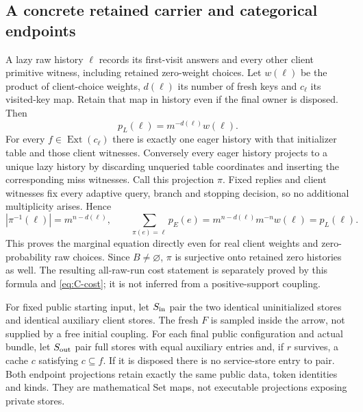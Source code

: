 \documentclass[11pt,a4paper]{article}
\theoremstyle{definition}
\begin{document}
\subsection{A concrete retained carrier and categorical endpoints}\label{sec:C-span}
A lazy raw history $\ell$ records its first-visit answers and every other
client primitive witness, including retained zero-weight choices. Let
$w(\ell)$ be the product of client-choice weights, $d(\ell)$ its number
of fresh keys and $c_\ell$ its visited-key map. Retain that map in history
even if the final owner is disposed. Then
\[
p_L(\ell)=m^{-d(\ell)}w(\ell).
\]
For every $f\in\operatorname{Ext}(c_\ell)$ there is exactly one eager
history with that initializer table and those client witnesses. Conversely
every eager history projects to a unique lazy history by discarding
unqueried table coordinates and inserting the corresponding miss witnesses.
Call this projection $\pi$. Fixed replies and client witnesses fix every
adaptive query, branch and stopping decision, so no additional multiplicity
arises. Hence
\begin{equation}\label{eq:C-fibre}
|\pi^{-1}(\ell)|=m^{n-d(\ell)},\qquad
\sum_{\pi(e)=\ell}p_E(e)
=m^{n-d(\ell)}m^{-n}w(\ell)=p_L(\ell).
\end{equation}
This proves the marginal equation directly even for real client weights
and zero-probability raw choices. Since $B\ne\varnothing$, $\pi$ is
surjective onto retained zero histories as well. The resulting all-raw-run
cost statement is separately proved by this formula and
\eqref{eq:C-cost}; it is not inferred from a positive-support coupling.

For fixed public starting input, let $S_{\rm in}$ pair the two identical
uninitialized stores and identical auxiliary client stores. The fresh
$F$ is sampled inside the arrow, not supplied by a free initial coupling.
For each final public configuration and actual bundle, let $S_{\rm out}$
pair full stores with equal auxiliary entries and, if $r$ survives, a
cache $c$ satisfying $c\subseteq f$. If it is disposed there is no
service-store entry to pair. Both endpoint projections retain exactly
the same public data, token identities and kinds. They are mathematical
Set maps, not executable projections exposing private stores.
\end{document}
